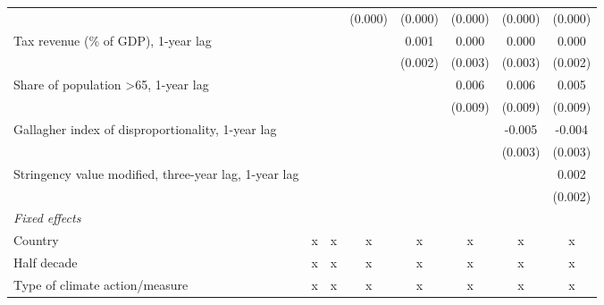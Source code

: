 \begin{tabular}{lccccccc}
                                                                  &                &                & (0.000)        & (0.000)       & (0.000)       & (0.000)       & (0.000)\\   
   Tax revenue (\% of GDP), 1-year lag                            &                &                &                & 0.001         & 0.000         & 0.000         & 0.000\\   
                                                                  &                &                &                & (0.002)       & (0.003)       & (0.003)       & (0.002)\\   
   Share of population >65, 1-year lag                            &                &                &                &               & 0.006         & 0.006         & 0.005\\   
                                                                  &                &                &                &               & (0.009)       & (0.009)       & (0.009)\\   
   Gallagher index of disproportionality, 1-year lag              &                &                &                &               &               & -0.005        & -0.004\\   
                                                                  &                &                &                &               &               & (0.003)       & (0.003)\\   
   Stringency value modified, three-year lag, 1-year lag          &                &                &                &               &               &               & 0.002\\   
                                                                  &                &                &                &               &               &               & (0.002)\\   
   \emph{Fixed effects}\\
   Country                                                        & x              & x              & x              & x             & x             & x             & x\\  
   Half decade                                                    & x              & x              & x              & x             & x             & x             & x\\  
   Type of climate action/measure                                 & x              & x              & x              & x             & x             & x             & x\\  

\end{tabular}
